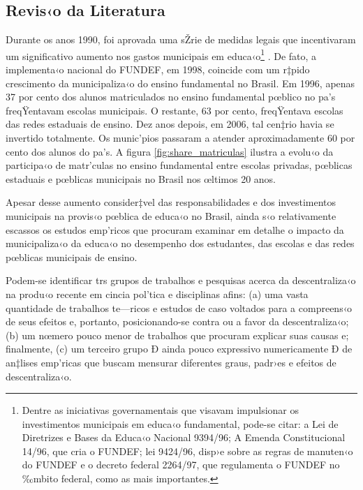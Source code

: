 \documentclass[a4paper, 12pt]{article}
\begin{document}
\pagebreak

\subsection{Revis‹o da Literatura}

Durante os anos 1990, foi aprovada uma sŽrie de medidas legais que incentivaram um significativo aumento nos gastos municipais em educa‹o\footnote{Dentre as iniciativas governamentais que visavam impulsionar os investimentos municipais em educa‹o fundamental, pode-se citar: a Lei de Diretrizes e Bases da Educa‹o Nacional 9394/96; A Emenda Constitucional 14/96, que cria o FUNDEF; lei 9424/96, disp›e sobre as regras de manuten‹o do FUNDEF e o decreto federal 2264/97, que regulamenta o FUNDEF no ‰mbito federal, como as mais importantes.} \cite{gomes_fatores_2008}.  De fato, a implementa‹o nacional do FUNDEF, em 1998, coincide com um r‡pido crescimento da municipaliza‹o do ensino fundamental no Brasil. Em 1996, apenas 37 por cento dos alunos matriculados no ensino fundamental pœblico no pa’s freqŸentavam escolas municipais. O restante, 63 por cento, freqŸentava escolas das redes estaduais de ensino. Dez anos depois, em 2006, tal cen‡rio havia se invertido totalmente. Os munic’pios passaram a atender aproximadamente 60 por cento dos alunos do pa’s. A figura  \ref{fig:share_matriculas}  ilustra a evolu‹o da participa‹o de matr’culas no ensino fundamental entre escolas privadas, pœblicas estaduais e pœblicas municipais no Brasil nos œltimos 20 anos. 

Apesar desse aumento consider‡vel das responsabilidades e dos investimentos municipais na provis‹o pœblica de educa‹o no Brasil, ainda s‹o relativamente escassos os estudos emp’ricos que procuram examinar em detalhe o impacto da municipaliza‹o da educa‹o no desempenho dos estudantes, das escolas e das redes pœblicas municipais de ensino.

Podem-se identificar trs grupos de trabalhos e pesquisas acerca da descentraliza‹o na produ‹o recente em cincia pol’tica e disciplinas afins: (a) uma vasta quantidade de trabalhos te—ricos e estudos de caso voltados para a compreens‹o de seus efeitos e, portanto, posicionando-se contra ou a favor da descentraliza‹o; (b) um nœmero pouco menor de trabalhos que procuram explicar suas causas e; finalmente, (c) um terceiro grupo Ð ainda pouco expressivo numericamente Ð de an‡lises emp’ricas que buscam mensurar diferentes graus, padr›es e efeitos de descentraliza‹o. 
\end{document}
